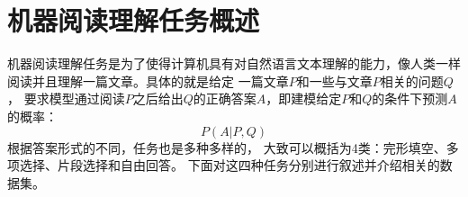 \section{机器阅读理解任务概述}


机器阅读理解任务是为了使得计算机具有对自然语言文本理解的能力，像人类一样阅读并且理解一篇文章。具体的就是给定
一篇文章$P$和一些与文章$P$相关的问题$Q$，
要求模型通过阅读$P$之后给出$Q$的正确答案$A$，即建模给定$P$和$Q$的条件下预测$A$的概率：
\begin{equation}
    P(A|P,Q)
\end{equation}
根据答案形式的不同，任务也是多种多样的，
大致可以概括为4类：完形填空、多项选择、片段选择和自由回答。
下面对这四种任务分别进行叙述并介绍相关的数据集。


        
